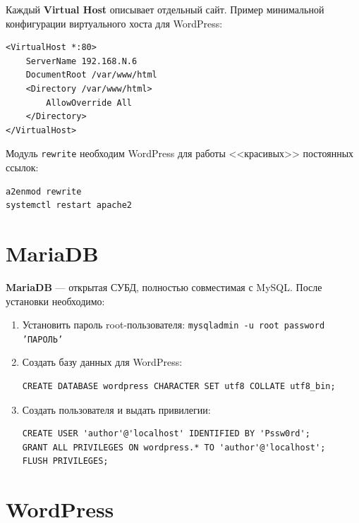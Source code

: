 Каждый \textbf{Virtual Host} описывает отдельный сайт. Пример минимальной
конфигурации виртуального хоста для WordPress:
\begin{lstlisting}
<VirtualHost *:80>
    ServerName 192.168.N.6
    DocumentRoot /var/www/html
    <Directory /var/www/html>
        AllowOverride All
    </Directory>
</VirtualHost>
\end{lstlisting}

Модуль \texttt{rewrite} необходим WordPress для работы
<<красивых>> постоянных ссылок:
\begin{lstlisting}
a2enmod rewrite
systemctl restart apache2
\end{lstlisting}

\section{MariaDB}

\textbf{MariaDB} --- открытая СУБД, полностью совместимая с MySQL.
После установки необходимо:
\begin{enumerate}
  \item Установить пароль root-пользователя:
        \texttt{mysqladmin -u root password 'ПАРОЛЬ'}
  \item Создать базу данных для WordPress:
\begin{lstlisting}
CREATE DATABASE wordpress CHARACTER SET utf8 COLLATE utf8_bin;
\end{lstlisting}
  \item Создать пользователя и выдать привилегии:
\begin{lstlisting}
CREATE USER 'author'@'localhost' IDENTIFIED BY 'Pssw0rd';
GRANT ALL PRIVILEGES ON wordpress.* TO 'author'@'localhost';
FLUSH PRIVILEGES;
\end{lstlisting}
\end{enumerate}

\section{WordPress}

